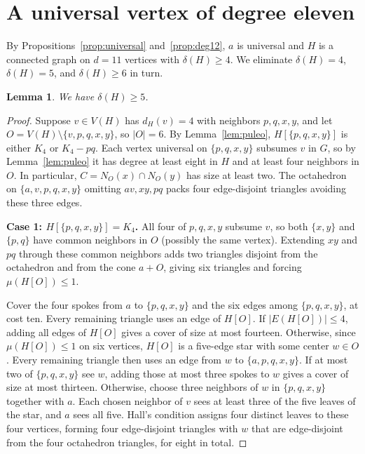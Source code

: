 \documentclass[11pt]{article}
\newtheorem{lemma}[theorem]{Lemma}
\begin{document}
\section{A universal vertex of degree eleven}

By Propositions~\ref{prop:universal} and~\ref{prop:deg12}, $a$ is universal and $H$ is a connected graph on $d=11$ vertices with $\delta(H)\geq 4$. We eliminate $\delta(H)=4$, $\delta(H)=5$, and $\delta(H)\geq 6$ in turn.

\begin{lemma}\label{lem:d11-deg4}
We have $\delta(H)\geq 5$.
\end{lemma}

\begin{proof}
Suppose $v\in V(H)$ has $d_H(v)=4$ with neighbors $p,q,x,y$, and let $O=V(H)\setminus\{v,p,q,x,y\}$, so $|O|=6$. By Lemma~\ref{lem:puleo}, $H[\{p,q,x,y\}]$ is either $K_4$ or $K_4-pq$. Each vertex universal on $\{p,q,x,y\}$ subsumes $v$ in $G$, so by Lemma~\ref{lem:puleo} it has degree at least eight in $H$ and at least four neighbors in $O$. In particular, $C=N_O(x)\cap N_O(y)$ has size at least two. The octahedron on $\{a,v,p,q,x,y\}$ omitting $av,xy,pq$ packs four edge-disjoint triangles avoiding these three edges.

\medskip
\noindent\textbf{Case 1: $H[\{p,q,x,y\}]=K_4$.}
All four of $p,q,x,y$ subsume $v$, so both $\{x,y\}$ and $\{p,q\}$ have common neighbors in $O$ (possibly the same vertex). Extending $xy$ and $pq$ through these common neighbors adds two triangles disjoint from the octahedron and from the cone $a+O$, giving six triangles and forcing $\mu(H[O])\leq 1$.

Cover the four spokes from $a$ to $\{p,q,x,y\}$ and the six edges among $\{p,q,x,y\}$, at cost ten. Every remaining triangle uses an edge of $H[O]$. If $|E(H[O])|\leq 4$, adding all edges of $H[O]$ gives a cover of size at most fourteen. Otherwise, since $\mu(H[O])\leq 1$ on six vertices, $H[O]$ is a five-edge star with some center $w\in O$. Every remaining triangle then uses an edge from $w$ to $\{a,p,q,x,y\}$. If at most two of $\{p,q,x,y\}$ see $w$, adding those at most three spokes to $w$ gives a cover of size at most thirteen. Otherwise, choose three neighbors of $w$ in $\{p,q,x,y\}$ together with $a$. Each chosen neighbor of $v$ sees at least three of the five leaves of the star, and $a$ sees all five. Hall's condition assigns four distinct leaves to these four vertices, forming four edge-disjoint triangles with $w$ that are edge-disjoint from the four octahedron triangles, for eight in total.


\end{proof}
\end{document}
